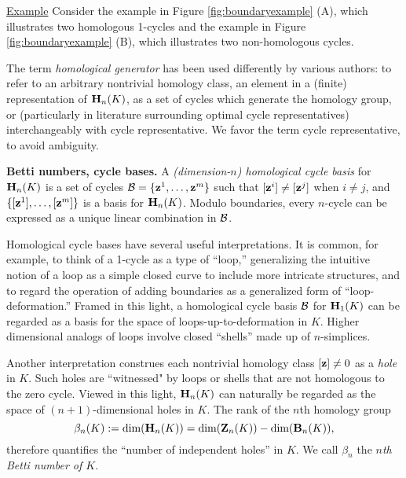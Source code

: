 \noindent \underline{Example} Consider the example in Figure \ref{fig:boundaryexample} (A), which illustrates two homologous 1-cycles and the example in Figure \ref{fig:boundaryexample} (B), which illustrates two non-homologous cycles. 
 

\begin{remark}
The term \emph{homological generator} has been used differently by various authors: to refer to an arbitrary nontrivial homology class, an element in a (finite) representation of $\mathbf{H}_n(K)$, as a set of cycles which generate the homology group, or (particularly in literature surrounding optimal cycle representatives)  interchangeably with cycle representative. We favor the term cycle representative, to avoid ambiguity.
\end{remark}




\noindent \textbf{Betti numbers, cycle bases.}  A \emph{(dimension-$n$) homological cycle basis} for $\mathbf{H}_n(K)$ is a set of cycles $\mathcal B = \{ {\mathbf z}^1 , \ldots, {\mathbf z}^m\}$ such that $[{\mathbf z}^i] \neq [{\mathbf z}^j]$ when $i \neq j$, and $\{ [{\mathbf z}^1] , \ldots, [{\mathbf z}^m]\}$ is a  basis for $\mathbf{H}_n(K)$.  Modulo boundaries, every $n$-cycle can be expressed as a unique linear combination in $\mathcal B$.  

Homological cycle bases have several useful interpretations.  It is common, for example, to think of a 1-cycle as a type of ``loop,'' generalizing the intuitive notion of a loop as a simple closed curve to include more intricate structures, and to regard the operation of adding boundaries as a generalized form of ``loop-deformation.''  Framed in this light, a homological cycle basis $\mathcal B$ for $\mathbf{H}_1(K)$ can be regarded as a basis for the space of loops-up-to-deformation in $K$. Higher dimensional analogs of loops involve closed ``shells'' made up of $n$-simplices.

Another interpretation construes each nontrivial homology class $[{\mathbf z}] \neq 0$ as a \emph{hole} in $K$. Such holes are ``witnessed" by loops or shells that are not homologous to the zero cycle. Viewed in this light, $\mathbf{H}_n(K)$ can naturally be regarded as the space of $(n+1)$-dimensional holes in $K$.  The rank of the $n$th homology group
    \[
    \beta_n(K) := \text{dim}(\mathbf{H}_n(K)) = \text{dim}(\mathbf{Z}_n(K)) - \text{dim}(\mathbf{B}_n(K)),
    \]
therefore quantifies the ``number of independent holes'' in $K$.  We call $\beta_n$ the \emph{$n$th Betti number of $K$}.  
 
